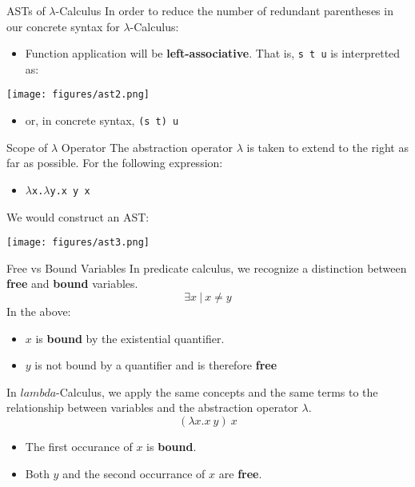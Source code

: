 \documentclass[11pt]{beamer}
\begin{document}
\begin{frame}[fragile=singleslide]{ASTs of $\lambda$-Calculus}
In order to reduce the number of redundant parentheses in our concrete syntax for $\lambda$-Calculus:
\begin{itemize}
\item Function application will be \textbf{left-associative}.  That is, \texttt{s t u} is interpretted as: \\
\end{itemize}

\begin{center}
\texttt{[image: figures/ast2.png]}
\end{center}
\begin{itemize}
\item or, in concrete syntax, \texttt{(s t) u}
\end{itemize}
\end{frame}

\begin{frame}[fragile=singleslide]{Scope of $\lambda$ Operator}
The abstraction operator $\lambda$ is taken to extend to the right as far as possible.  For the following expression:
\begin{itemize}
\item $\lambda$\texttt{x.}$\lambda$\texttt{y.x y x}
\end{itemize}
We would construct an AST:

\begin{center}
\texttt{[image: figures/ast3.png]}
\end{center}

\end{frame}

\begin{frame}[fragile=singleslide]{Free vs Bound Variables}
In predicate calculus, we recognize a distinction between \textbf{free} and \textbf{bound} variables.
\begin{equation}
\exists x\:|\:x \neq y
\end{equation}
In the above:
\begin{itemize}
\item $x$ is \textbf{bound} by the existential quantifier.
\item $y$ is not bound by a quantifier and is therefore \textbf{free}
\end{itemize}
In $lambda$-Calculus, we apply the same concepts and the same terms to the relationship between variables and the abstraction operator $\lambda$.
\begin{equation}
(\lambda x . x\:y)\:x
\end{equation}
\begin{itemize}
\item The first occurance of $x$ is \textbf{bound}.
\item Both $y$ and the second occurrance of $x$ are \textbf{free}.
\end{itemize}
\end{frame}
\end{document}

